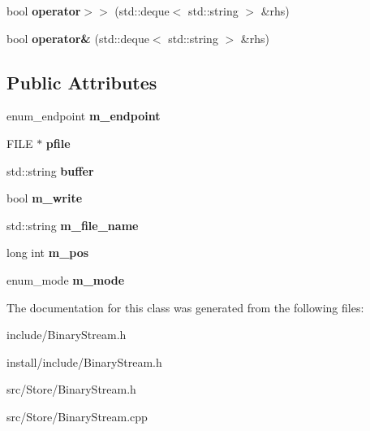 \begin{DoxyCompactItemize}
\item 
\hypertarget{classBinaryStream_a13827a06ad9d0321a30c8e4a460aefd1}{bool {\bfseries operator$>$$>$} (std\-::deque$<$ std\-::string $>$ \&rhs)}\label{classBinaryStream_a13827a06ad9d0321a30c8e4a460aefd1}

\item 
\hypertarget{classBinaryStream_a80b6b47ffd83d312c343556b9c52f0b8}{bool {\bfseries operator\&} (std\-::deque$<$ std\-::string $>$ \&rhs)}\label{classBinaryStream_a80b6b47ffd83d312c343556b9c52f0b8}

\end{DoxyCompactItemize}
\subsection*{Public Attributes}
\begin{DoxyCompactItemize}
\item 
\hypertarget{classBinaryStream_a056258a29881cd6d53b271ac9d77fe7c}{enum\-\_\-endpoint {\bfseries m\-\_\-endpoint}}\label{classBinaryStream_a056258a29881cd6d53b271ac9d77fe7c}

\item 
\hypertarget{classBinaryStream_a88acd60c17fe346abf420f3ce9960f91}{F\-I\-L\-E $\ast$ {\bfseries pfile}}\label{classBinaryStream_a88acd60c17fe346abf420f3ce9960f91}

\item 
\hypertarget{classBinaryStream_a9b47384e855aaac8fa9d55f49e8fbe95}{std\-::string {\bfseries buffer}}\label{classBinaryStream_a9b47384e855aaac8fa9d55f49e8fbe95}

\item 
\hypertarget{classBinaryStream_a71ae465f16d2d66c559abab48e7ab1c6}{bool {\bfseries m\-\_\-write}}\label{classBinaryStream_a71ae465f16d2d66c559abab48e7ab1c6}

\item 
\hypertarget{classBinaryStream_a791a88624d85fd9f48ba4ee85948f9e8}{std\-::string {\bfseries m\-\_\-file\-\_\-name}}\label{classBinaryStream_a791a88624d85fd9f48ba4ee85948f9e8}

\item 
\hypertarget{classBinaryStream_a98516726606b927c4178c0b449781695}{long int {\bfseries m\-\_\-pos}}\label{classBinaryStream_a98516726606b927c4178c0b449781695}

\item 
\hypertarget{classBinaryStream_a1f5e15f43725da5773b20169b07c689f}{enum\-\_\-mode {\bfseries m\-\_\-mode}}\label{classBinaryStream_a1f5e15f43725da5773b20169b07c689f}

\end{DoxyCompactItemize}


The documentation for this class was generated from the following files\-:\begin{DoxyCompactItemize}
\item 
include/Binary\-Stream.\-h\item 
install/include/Binary\-Stream.\-h\item 
src/\-Store/Binary\-Stream.\-h\item 
src/\-Store/Binary\-Stream.\-cpp\end{DoxyCompactItemize}
